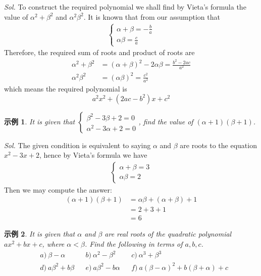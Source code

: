 \documentclass[12pt]{article}
\newtheorem{example}{示例}
\begin{document}
    \textit{ Sol.} To construct the required polynomial we shall find by Vieta's formula the value of $\alpha^2+\beta^2$ and $\alpha^2\beta^2$. It is known that from our assumption that \begin{align*}
        \begin{cases}
            \alpha+\beta=-\frac{b}{a}\\
            \alpha\beta=\frac{c}{a}
        \end{cases}
    \end{align*}
    Therefore, the required sum of roots and product of roots are \begin{align*}
        \alpha^2+\beta^2&=(\alpha+\beta)^2-2\alpha\beta=\frac{b^2-2ac}{a^2}\\
        \alpha^2\beta^2&=(\alpha\beta)^2=\frac{c^2}{a^2}
    \end{align*}
    which means the required polynomial is $$a^2x^2+(2ac-b^2)x+c^2$$

    \begin{example}
        It is given that $\begin{cases}
                \beta^2-3\beta+2=0\\
                \alpha^2-3\alpha+2=0
            \end{cases}$, find the value of $(\alpha+1)(\beta+1)$.
    \end{example}

    \textit{ Sol.} The given condition is equivalent to saying $\alpha$ and $\beta$ are roots to the equation $x^2-3x+2$, hence by Vieta's formula we have \begin{align*}
        \begin{cases}
            \alpha+\beta=3\\
            \alpha\beta=2
        \end{cases}
    \end{align*}
    Then we may compute the answer:\begin{align*}
        (\alpha+1)(\beta+1)&=\alpha\beta+(\alpha+\beta)+1\\
        &=2+3+1\\
        &=6
    \end{align*}

    \begin{example}
        It is given that $\alpha$ and $\beta$ are real roots of the quadratic polynomial $ax^2+bx+c$, where $\alpha<\beta$. Find the following in terms of $a,b,c$.\begin{align*}
            &a)\ \beta-\alpha&&b)\ \alpha^2-\beta^2&&c)\ \alpha^3+\beta^3\\
            &d)\ a\beta^2+b\beta&&e)\ a\beta^2-b\alpha&&f)\ a(\beta-\alpha)^2+b(\beta+\alpha)+c
        \end{align*}
    \end{example}
\end{document}
